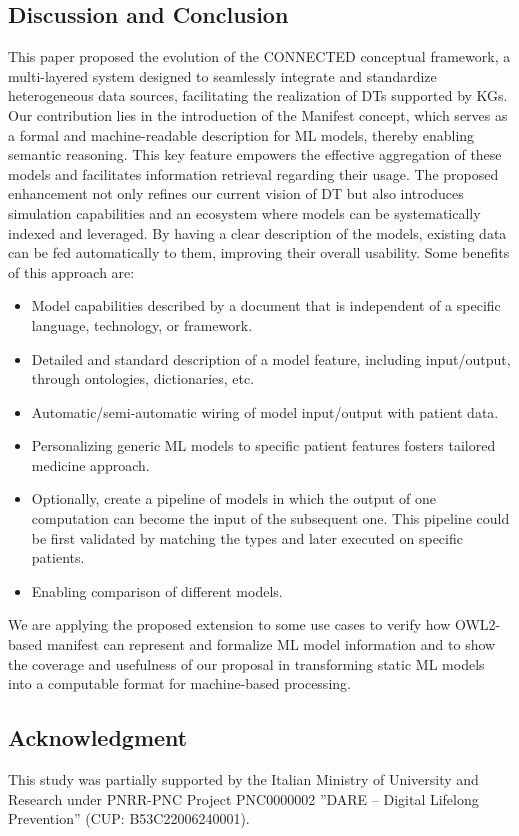 \subsection{Discussion and Conclusion}\label{sec:paper4_discussion}
This paper proposed the evolution of the CONNECTED conceptual framework, a multi-layered system designed to seamlessly integrate and standardize heterogeneous data sources, facilitating the realization of DTs supported by KGs. Our contribution lies in the introduction of the Manifest concept, which serves as a formal and machine-readable description for ML models, thereby enabling semantic reasoning. This key feature empowers the effective aggregation of these models and facilitates information retrieval regarding their usage. The proposed enhancement not only refines our current vision of DT but also introduces simulation capabilities and an ecosystem where models can be systematically indexed and leveraged. By having a clear description of the models, existing data can be fed automatically to them, improving their overall usability. Some benefits of this approach are: 
\begin{itemize}
    \item Model capabilities described by a document that is independent of a specific language, technology, or framework. 
    \item Detailed and standard description of a model feature, including input/output, through ontologies, dictionaries, etc. 
    \item Automatic/semi-automatic wiring of model input/output with patient data. 
    \item Personalizing generic ML models to specific patient features fosters tailored medicine approach. 
    \item Optionally, create a pipeline of models in which the output of one computation can become the input of the subsequent one. This pipeline could be first validated by matching the types and later executed on specific patients. 
    \item Enabling comparison of different models. 
\end{itemize}
We are applying the proposed extension to some use cases to verify how OWL2-based manifest can represent and formalize ML model information and to show the coverage and usefulness of our proposal in transforming static ML models into a computable format for machine-based processing.

\subsection*{Acknowledgment}
This study was partially supported by the Italian Ministry
of University and Research under PNRR-PNC Project
PNC0000002 ”DARE – Digital Lifelong Prevention” (CUP: B53C22006240001).

\FloatBarrier
